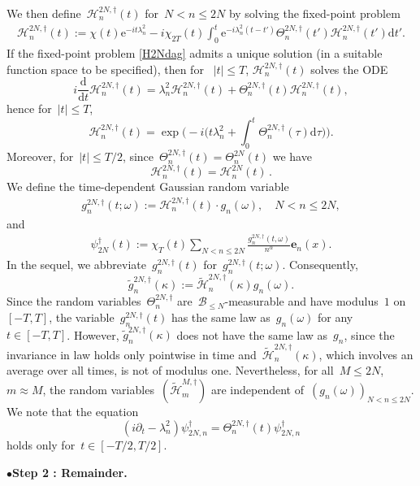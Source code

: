 \documentclass[11pt,reqno,english]{amsart}
\numberwithin{equation}{section}
\theoremstyle{plain}
\theoremstyle{definition}
\theoremstyle{remark}
\newcommand{\noi}{\noindent}
\newcommand{\e}{\mathrm{e}}
\begin{document}
We then define~$\mathcal{H}_n^{2N,\dag}(t)$ for~$N<n\leq 2N$ by solving the fixed-point problem
\begin{align}\label{H2Ndag}
	\mathcal{H}_n^{2N,\dag}(t):=\chi(t)\e^{-it\lambda_n^2}-i\chi_{2T}(t)\int_0^t
	\e^{-i\lambda_n^2(t-t')}\Theta_n^{2N,\dag}(t')\mathcal{H}_{n}^{2N,\dag}(t')\mathrm{d}t'.
\end{align}
If the fixed-point problem \eqref{H2Ndag} admits a unique solution (in a suitable function space to be specified), then for ~$|t|\leq T$, $\mathcal{H}_n^{2N,\dag}(t)$ solves the ODE
\[
i\frac{\mathrm{d}}{\mathrm{d}t}\mathcal{H}_n^{2N,\dag}(t)=\lambda_n^2\mathcal{H}_n^{2N,\dag}(t)+\Theta_n^{2N,\dag}(t)\mathcal{H}_n^{2N,\dag}(t),
\]
hence for~$|t|\leq T$,
\[
\mathcal{H}_n^{2N,\dag}(t)=\exp\Big(-i\Big(t\lambda_n^2+\int_0^t\Theta_n^{2N,\dag}(\tau)\mathrm{d}\tau\Big)\Big).
\]
Moreover, for~$|t|\leq T/2$, since~$\Theta_n^{2N,\dag}(t)=\Theta_n^{2N}(t)$ we have
\[
\mathcal{H}_n^{2N,\dag}(t)=\mathcal{H}_n^{2N}(t)\,.
\]
We define the time-dependent Gaussian random variable
\begin{align}\label{def:gndag}
	g^{2N,\dag}_n(t;\omega):=\mathcal{H}_n^{2N,\dag}(t)\cdot g_n(\omega),\quad N<n\leq 2N,
\end{align}
and
\begin{align}\label{def:psi2Ndag}
	\psi_{2N}^{\dag}(t):=\chi_T(t)\sum_{N<n\leq 2N}\frac{g^{2N,\dag}_n(t,\omega)}{n^{\alpha}}\mathbf{e}_n(x).
\end{align}
In the sequel, we abbreviate~$g_n^{2N,\dag}(t)$ for~$g_n^{2N,\dag}(t;\omega)$. Consequently,
\[
\widetilde{g}_n^{2N,\dag}(\kappa):=\widetilde{\mathcal{H}}_n^{2N,\dag}(\kappa)g_n(\omega).
\]
Since the random variables~${\Theta}_n^{2N,\dag}$ are~$\mathcal{B}_{\leq N}$-measurable and have modulus~$1$ on~$[-T,T]$, the variable~$g_n^{2N,\dag}(t)$ has the same law as~$g_n(\omega)$ for any~$t\in[-T,T]$. However, $\widetilde{g}_n^{2N,\dag}(\kappa)$ does not have the same law as~$g_n$, since the invariance in law holds only pointwise in time and~$\widetilde{\mathcal{H}}_n^{2N,\dag}(\kappa)$, which involves an average over all times, is not of modulus one. Nevertheless, for all~$M\leq 2N$, $m\approx M$, the random variables~$(\widetilde{\mathcal H}_m^{M,\dag})$ are independent of~$(g_n(\omega))_{N<n\leq 2N}$.
We note that the equation
\[
(i\partial_t-\lambda_n^2)\psi^{\dag}_{2N,n}=\Theta_{n}^{2N,\dag}(t)\psi_{2N,n}^{\dag}
\]
holds only for~$t\in[-T/2,T/2]$.


\medskip
\noi$\bullet${\bf Step 2 : Remainder. }
\end{document}
